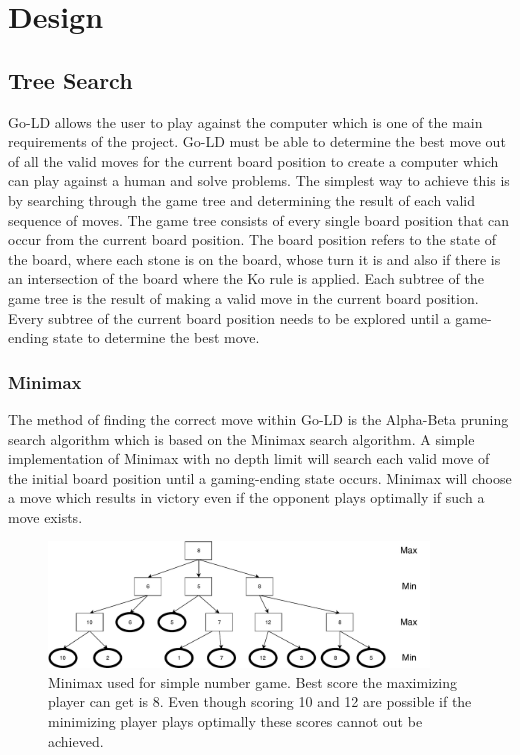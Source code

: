 \documentclass{l4proj}
\begin{document}
\chapter{Design}


\section{Tree Search}
Go-LD allows the user to play against the computer which is one of the main requirements of the project.  Go-LD must be able to determine the best move out of all the valid moves for the current board position to create a computer which can play against a human and solve problems. The simplest way to achieve this is by searching through the game tree and determining the result of each valid sequence of moves. The game tree consists of every single board position that can occur from the current board position. The board position refers to the state of the board, where each stone is on the board, whose turn it is and also if there is an intersection of the board where the Ko rule is applied. Each subtree of the game tree is the result of making a valid move in the current board position. Every subtree of the current board position needs to be explored until a game-ending state to determine the best move.

\subsection{Minimax}
The method of finding the correct move within Go-LD is the Alpha-Beta pruning search algorithm which is based on the Minimax search algorithm. A simple implementation of Minimax with no depth limit will search each valid move of the initial board position until a gaming-ending state occurs. Minimax will choose a move which results in victory even if the opponent plays optimally if such a move exists.

\begin{figure}[!ht]
\centering
\includegraphics[width=0.9\textwidth]{MinMaxNumTree.pdf}
\caption{Minimax used for simple number game. Best score the maximizing player can get is 8. Even though scoring 10 and 12 are possible if the minimizing player plays optimally these scores cannot out be achieved.}
\label{fig:MinMaxNumTree}
\end{figure}
\end{document}
